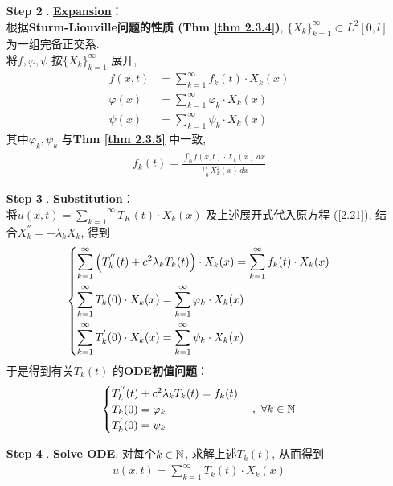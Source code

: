 \begin{enumerate}
		\vspace*{2em}
		
		\item[\textbf{Step 2}]. \underline{\textbf{Expansion}}：\\
		根据\textbf{Sturm-Liouville问题的性质 (Thm \ref{thm 2.3.4})}, $\{ X_k \}_{k = 1}^{\infty} \subset L^2[0 , l]$ 为一组完备正交系. \\
		将$f , \varphi , \psi$ 按$\{ X_k \}_{k = 1}^{\infty}$ 展开, 
		\begin{align*}
			f(x , t) &= \sum_{k = 1}^{\infty} f_{k}(t) \cdot X_k(x) \\
			\varphi(x) &= \sum_{k = 1}^{\infty} \varphi_k \cdot X_k(x) \\
			\psi(x) &= \sum_{k = 1}^{\infty} \psi_k \cdot X_k(x)
		\end{align*}
		其中$\varphi_k , \psi_k$ 与\textbf{Thm \ref{thm 2.3.5}} 中一致, 
		\begin{align*}
			f_k(t) = \frac{\int_{0}^l f(x , t) \cdot X_k(x) \, dx}{\int_{0}^l X_{k}^2(x) \, dx}
		\end{align*}
		
		\vspace*{2em}
		
		\item[\textbf{Step 3}]. \underline{\textbf{Substitution}}：\\
		将$u(x , t) = \overset{\infty}{\underset{k = 1}{\sum}} T_K(t) \cdot X_k(x)$ 及上述展开式代入原方程 (\ref{2.21}), 结合$X_{k}^{''} = -\lambda_k X_k$, 得到
		\begin{align*}
			\begin{dcases}
				\sum_{k = 1}^{\infty} \Big( T_{k}^{''}(t) + c^2 \lambda_k T_{k}(t) \Big) \cdot X_k(x) 
				= \sum_{k = 1}^{\infty} f_k(t) \cdot X_k(x) \\
				\sum_{k = 1}^{\infty} T_k(0) \cdot X_k(x) =  \sum_{k = 1}^{\infty} \varphi_k \cdot X_k(x) \\
				\sum_{k = 1}^{\infty} T_{k}^{'}(0) \cdot X_k(x) = \sum_{k = 1}^{\infty} \psi_k \cdot X_k(x) 
			\end{dcases}
		\end{align*}
		于是得到有关$T_k(t)$ 的\textbf{ODE初值问题}：
		\begin{align*}
			\begin{cases}
				T_{k}^{''}(t) + c^2 \lambda_k T_k(t) = f_k(t) \\
				T_k(0) = \varphi_k \\
				T_{k}^{'}(0) = \psi_k
			\end{cases} , \,\, \forall k \in \mathbb{N}
		\end{align*}
		
		\vspace*{2em}
		
		\item[\textbf{Step 4}]. \underline{\textbf{Solve ODE}}. 对每个$k \in \mathbb{N}$, 求解上述$T_k(t)$, 从而得到
		\begin{align*}
			u(x , t) = \sum_{k = 1}^{\infty} T_k(t) \cdot X_k(x)
		\end{align*}
	\end{enumerate}

